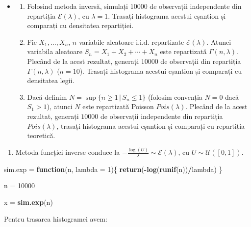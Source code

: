 \documentclass[]{article}
\newenvironment{Shaded}{\begin{snugshade}}{\end{snugshade}}
\newcommand{\KeywordTok}[1]{\textcolor[rgb]{0.13,0.29,0.53}{\textbf{#1}}}
\newcommand{\DataTypeTok}[1]{\textcolor[rgb]{0.13,0.29,0.53}{#1}}
\newcommand{\DecValTok}[1]{\textcolor[rgb]{0.00,0.00,0.81}{#1}}
\newcommand{\StringTok}[1]{\textcolor[rgb]{0.31,0.60,0.02}{#1}}
\newcommand{\ControlFlowTok}[1]{\textcolor[rgb]{0.13,0.29,0.53}{\textbf{#1}}}
\newcommand{\OperatorTok}[1]{\textcolor[rgb]{0.81,0.36,0.00}{\textbf{#1}}}
\newcommand{\NormalTok}[1]{#1}
\providecommand{\tightlist}{%
  \setlength{\itemsep}{0pt}\setlength{\parskip}{0pt}}
\newenvironment{frshaded*}{%
  \def\FrameCommand{\fboxrule=\FrameRule\fboxsep=\FrameSep \fcolorbox{framecolor}{shadecolor1}}%
  \MakeFramed {\advance\hsize-\width \FrameRestore}}%
{\endMakeFramed}
\newenvironment{rmdblock}[1]
  {\begin{frshaded*}
  \begin{itemize}
  \renewcommand{\labelitemi}{
    \raisebox{-.7\height}[0pt][0pt]{
      {\setkeys{Gin}{width=2em,keepaspectratio}\texttt{[image: images/icons/\#1]}}
    }
  }
  \item
  }
  {
  \end{itemize}
  \end{frshaded*}
  }
\newenvironment{rmdexercise}
  {\begin{rmdblock}{exercise}}
  {\end{rmdblock}}
\begin{document}
\begin{rmdexercise}
\begin{enumerate}
\def\labelenumi{\arabic{enumi}.}
\item
  Folosind metoda inversă, simulați \(10000\) de observații independente
  din repartiția \(\mathcal{E}(\lambda)\), cu \(\lambda = 1\). Trasați
  histograma acestui eșantion și comparați cu densitatea repartiției.
\item
  Fie \(X_1, \ldots, X_n\), \(n\) variabile aleatoare i.i.d. repartizate
  \(\mathcal{E}(\lambda)\). Atunci variabila aleatoare
  \(S_n = X_1 + X_2 +\cdots+ X_n\) este repartizată
  \(\Gamma(n, \lambda)\). Plecând de la acest rezultat, generați
  \(10000\) de observații din repartiția \(\Gamma(n, \lambda)\)
  (\(n = 10\)). Trasați histograma acestui eșantion și comparați cu
  densitatea legii.
\item
  Dacă definim \(N = \sup\{n\geq 1\,|\, S_n\leq 1\}\) (folosim convenția
  \(N = 0\) dacă \(S_1>1\)), atunci \(N\) este repartizată Poisson
  \(Pois(\lambda)\). Plecând de la acest rezultat, generați \(10000\) de
  observații independente din repartiția \(Pois(\lambda)\), trasați
  histograma acestui eșantion și comparați cu repartiția teoretică.
\end{enumerate}
\end{rmdexercise}

\begin{enumerate}
\def\labelenumi{\arabic{enumi}.}
\tightlist
\item
  Metoda funcției inverse conduce la
  \(-\frac{\log(U)}{\lambda}\sim\mathcal{E}(\lambda)\), cu
  \(U\sim\mathcal{U}([0,1])\).
\end{enumerate}

\begin{Shaded}
\begin{Highlighting}[]
\NormalTok{sim.exp =}\StringTok{ }\ControlFlowTok{function}\NormalTok{(n, }\DataTypeTok{lambda =} \DecValTok{1}\NormalTok{)\{}
  \KeywordTok{return}\NormalTok{(}\OperatorTok{-}\KeywordTok{log}\NormalTok{(}\KeywordTok{runif}\NormalTok{(n))}\OperatorTok{/}\NormalTok{lambda)}
\NormalTok{\}}

\NormalTok{n =}\StringTok{ }\DecValTok{10000}

\NormalTok{x =}\StringTok{ }\KeywordTok{sim.exp}\NormalTok{(n)}
\end{Highlighting}
\end{Shaded}

Pentru trasarea histogramei avem:
\end{document}
